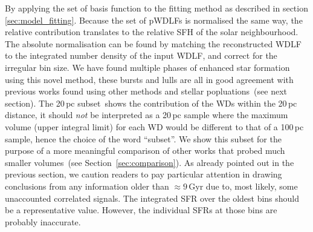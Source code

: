 \documentclass[fleqn,usenatbib]{mnras}
\begin{document}
By applying the set of basis function to the fitting method as described in
section \textsection\ref{sec:model_fitting}. Because the set of pWDLFs is
normalised the same way, the relative contribution translates to the relative
SFH of the solar neighbourhood. The absolute normalisation can be found by
matching the reconstructed WDLF to the integrated number density of the input
WDLF, and correct for the irregular bin size. We have found multiple phases of
enhanced star formation using this novel method, these bursts and lulls are all
in good agreement with previous works found using other methods and stellar 
popluations~(see next section). The 20\,pc subset\ shows the contribution of the
WDs within the 20\,pc distance, it should \textit{not} be interpreted as a
20\,pc sample where the maximum volume (upper integral limit) for each WD would
be different to that of a 100\,pc sample, hence the choice of the word
``subset''. We show this subset for the purpose of a more meaningful comparison
of other works that probed much smaller volumes~(see 
Section~\ref{sec:comparison}). As already pointed out in the previous section,
we caution readers to pay particular attention in drawing conclusions from any 
information older than $\approx9$\,Gyr due to, most likely, some unaccounted 
correlated signals. The integrated SFR over the oldest bins should be a 
representative value. However, the individual SFRs at those bins are probably 
inaccurate.
\end{document}
